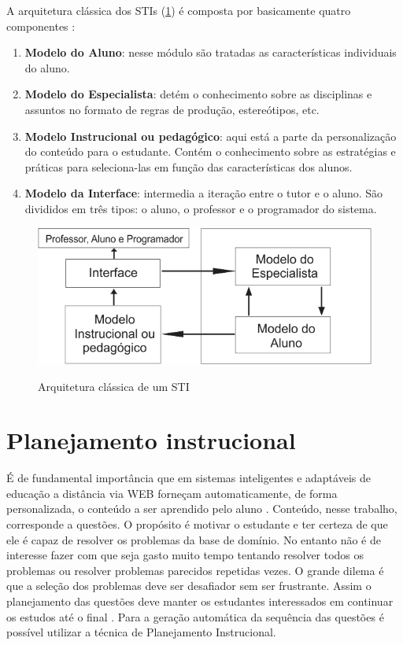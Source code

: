 \documentclass[
12pt,				%
oneside,			%
a4paper,			%
english,			%
brazil				%
]{abntex2ppgsi}
\begin{document}
A arquitetura clássica dos STIs (\ref{fig:figura1}) é composta por basicamente quatro componentes \cite{kaplan1995}:

\begin{enumerate}
	\item \textbf{Modelo do Aluno}: nesse módulo são tratadas as características individuais do aluno.
	\item \textbf{Modelo do Especialista}: detém o conhecimento sobre as disciplinas e assuntos no formato de regras de produção, estereótipos, etc.
	\item \textbf{Modelo Instrucional ou pedagógico}: aqui está a parte da personalização do conteúdo para o estudante. Contém o conhecimento sobre as estratégias e práticas para seleciona-las em função das características dos alunos.
	\item \textbf{Modelo da Interface}: intermedia a iteração entre o tutor e o aluno. São divididos em três tipos: o aluno, o professor e o programador do sistema.
\end{enumerate}

%
\begin{figure}[H]%
	\centering
	\caption{Arquitetura clássica de um STI}
	\includegraphics{figura1.png}
	\label{fig:figura1}
\end{figure}

\section{Planejamento instrucional}

É de fundamental importância que em sistemas inteligentes e adaptáveis de educação a distância via WEB forneçam automaticamente, de forma personalizada, o conteúdo a ser aprendido pelo aluno \cite{brusilovsky2003}. Conteúdo, nesse trabalho, corresponde a questões. O propósito é motivar o estudante e ter certeza de que ele é capaz de resolver os problemas da base de domínio. No entanto não é de interesse fazer com que seja gasto muito tempo tentando resolver todos os problemas ou resolver problemas parecidos repetidas vezes. O grande dilema é que a seleção dos problemas deve ser desafiador sem ser frustrante. Assim o planejamento das questões deve manter os estudantes interessados em continuar os estudos até o final \cite{cho2000}. Para a geração automática da sequência das questões é possível utilizar a técnica de Planejamento Instrucional.
\end{document}
